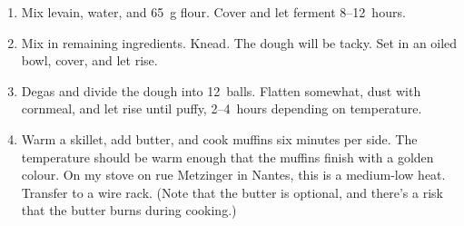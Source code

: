 
\begin{ingredients}
\end{ingredients}


\begin{recipe}
  \begin{enumerate}

  \item Mix levain, water, and 65~g flour.  Cover and let ferment
    8--12~hours.

  \item Mix in remaining ingredients.  Knead.  The dough will be
    tacky.  Set in an oiled bowl, cover, and let rise.

  \item Degas and divide the dough into 12~balls.  Flatten
    somewhat, dust with cornmeal, and let rise until puffy, 2--4~hours
    depending on temperature.
    
  \item Warm a skillet, add butter, and cook muffins six minutes per
    side.  The temperature should be warm enough that the muffins
    finish with a golden colour.  On my stove on rue Metzinger in
    Nantes, this is a medium-low heat.  Transfer to a wire rack.
    (Note that the butter is optional, and there's a risk that the
    butter burns during cooking.)

  \end{enumerate}
\end{recipe}

